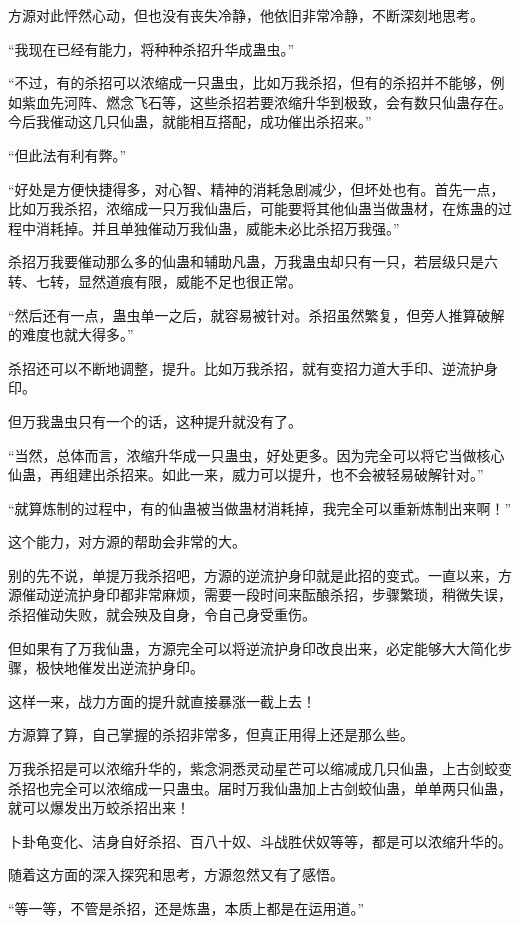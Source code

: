 \begin{this_body}
方源对此怦然心动，但也没有丧失冷静，他依旧非常冷静，不断深刻地思考。

“我现在已经有能力，将种种杀招升华成蛊虫。”

“不过，有的杀招可以浓缩成一只蛊虫，比如万我杀招，但有的杀招并不能够，例如紫血先河阵、燃念飞石等，这些杀招若要浓缩升华到极致，会有数只仙蛊存在。今后我催动这几只仙蛊，就能相互搭配，成功催出杀招来。”

“但此法有利有弊。”

“好处是方便快捷得多，对心智、精神的消耗急剧减少，但坏处也有。首先一点，比如万我杀招，浓缩成一只万我仙蛊后，可能要将其他仙蛊当做蛊材，在炼蛊的过程中消耗掉。并且单独催动万我仙蛊，威能未必比杀招万我强。”

杀招万我要催动那么多的仙蛊和辅助凡蛊，万我蛊虫却只有一只，若层级只是六转、七转，显然道痕有限，威能不足也很正常。

“然后还有一点，蛊虫单一之后，就容易被针对。杀招虽然繁复，但旁人推算破解的难度也就大得多。”

杀招还可以不断地调整，提升。比如万我杀招，就有变招力道大手印、逆流护身印。

但万我蛊虫只有一个的话，这种提升就没有了。

“当然，总体而言，浓缩升华成一只蛊虫，好处更多。因为完全可以将它当做核心仙蛊，再组建出杀招来。如此一来，威力可以提升，也不会被轻易破解针对。”

“就算炼制的过程中，有的仙蛊被当做蛊材消耗掉，我完全可以重新炼制出来啊！”

这个能力，对方源的帮助会非常的大。

别的先不说，单提万我杀招吧，方源的逆流护身印就是此招的变式。一直以来，方源催动逆流护身印都非常麻烦，需要一段时间来酝酿杀招，步骤繁琐，稍微失误，杀招催动失败，就会殃及自身，令自己身受重伤。

但如果有了万我仙蛊，方源完全可以将逆流护身印改良出来，必定能够大大简化步骤，极快地催发出逆流护身印。

这样一来，战力方面的提升就直接暴涨一截上去！

方源算了算，自己掌握的杀招非常多，但真正用得上还是那么些。

万我杀招是可以浓缩升华的，紫念洞悉灵动星芒可以缩减成几只仙蛊，上古剑蛟变杀招也完全可以浓缩成一只蛊虫。届时万我仙蛊加上古剑蛟仙蛊，单单两只仙蛊，就可以爆发出万蛟杀招出来！

卜卦龟变化、洁身自好杀招、百八十奴、斗战胜伏奴等等，都是可以浓缩升华的。

随着这方面的深入探究和思考，方源忽然又有了感悟。

“等一等，不管是杀招，还是炼蛊，本质上都是在运用道。”


\end{this_body}
